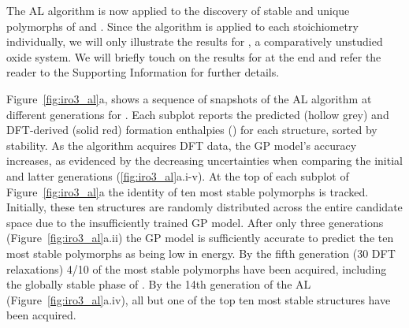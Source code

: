 %



%
The AL algorithm is now applied to the discovery of stable and unique polymorphs of \IrOtwo and \IrOthree.
%
Since the algorithm is applied to each stoichiometry individually,
we will only illustrate the results for \IrOthree,
a comparatively unstudied oxide system.
%
We will briefly touch on the results for \IrOtwo at the end and refer the reader to the Supporting Information for further details.


%
%
Figure~\ref{fig:iro3_al}a, shows a sequence of snapshots of the AL algorithm at different generations for \IrOthree.
%
Each subplot reports the predicted (hollow grey) and DFT-derived (solid red) formation enthalpies (\DHf) for each structure, sorted by stability.
%
As the algorithm acquires DFT data, the GP model's accuracy increases,
as evidenced by the decreasing uncertainties when comparing the initial and latter generations (\ref{fig:iro3_al}a.i-v).
%
At the top of each subplot of Figure~\ref{fig:iro3_al}a the identity of ten most stable polymorphs is tracked.
%
Initially, these ten structures are randomly distributed across the entire candidate space due to the insufficiently trained GP model.
%
After only three generations (Figure~\ref{fig:iro3_al}a.ii) the GP model is sufficiently accurate to predict the ten most stable polymorphs as being low in energy.
%
By the fifth generation (\num{30} DFT relaxations) \num{4/10} of the most stable polymorphs have been acquired,
including the globally stable phase of \IrOthree.
%
By the 14th generation of the AL
(Figure~\ref{fig:iro3_al}a.iv),
all but one of the top ten most stable structures have been acquired.


